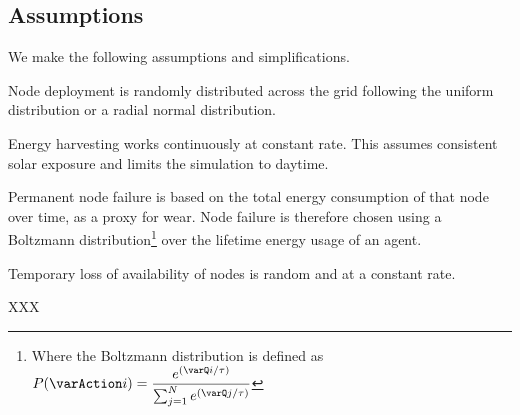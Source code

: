 	\subsection{Assumptions}
	We make the following assumptions and simplifications.
	\begin{itemize}{
			\item Node deployment is randomly distributed across the grid following the uniform distribution or a radial normal distribution.
			\item Energy harvesting works continuously at constant rate. This assumes consistent solar exposure and limits the simulation to daytime.
			\item Permanent node failure is based on the total energy consumption of that node over time, as a proxy for wear. Node failure is therefore chosen using a Boltzmann distribution\footnote{Where the Boltzmann distribution is defined as $\functionBoltzmann{}{}$} over the lifetime energy usage of an agent.
			\item Temporary loss of availability of nodes is random and at a constant rate.
		}
	\end{itemize}
	
	
	
	
	\begin{definition}[Energy]
		XXX
	\end{definition}
	
	